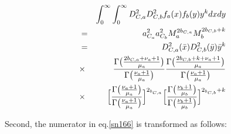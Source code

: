 \begin{eqnarray}
& &\int_{0}^{\infty}\int_{0}^{\infty}D_{C,a}^{2}D_{C,b}^{2}f_{a}(x)f_{b}(y)y^{k}dxdy\nonumber\\
&=&a_{C_{a}}^{2}a_{C_{b}}^{2}M_{a}^{2b_{C,a}}M_{b}^{2b_{C,b}+k}\nonumber\\
&=&D_{C,a}^{2}(\bar{x})D_{C,b}^{2}(\bar{y})\bar{y}^{k}\nonumber\\
&\times&\frac{\Gamma\bigl(\frac{2b_{C,a}+\nu_{a}+1}{\mu_{a}}\bigr)}{\Gamma\bigl(\frac{\nu_{a}+1}{\mu_{a}}\bigr)}
\frac{\Gamma\bigl(\frac{2b_{C,b}+k+\nu_{a}+1}{\mu_{a}}\bigr)}{\Gamma\bigl(\frac{\nu_{a}+1}{\mu_{a}}\bigr)}\nonumber\\
&\times&\Bigl[\frac{\Gamma\bigl(\frac{\nu_{a}+1}{\mu_{a}}\bigr)}{\Gamma\bigl(\frac{\nu_{a}+1}{\mu_{a}}\bigr)}\Bigl]^{2_{b_{C,a}}}
\Bigl[\frac{\Gamma\bigl(\frac{\nu_{b}+1}{\mu_{b}}\bigr)}{\Gamma\bigl(\frac{\nu_{b}+1}{\mu_{b}}\bigr)}\Bigl]^{2_{b_{C,b}}+k}\label{sn168}
\end{eqnarray}

Second, the numerator in eq.\ref{sn166} is transformed as follows:


